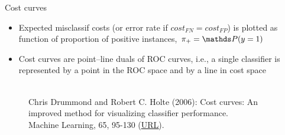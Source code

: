 \documentclass[11pt,compress,t,notes=noshow, xcolor=table]{beamer}
\begin{document}

\begin{vbframe}{Cost curves}

\begin{footnotesize}

\begin{itemize}
  \item Expected misclassif costs (or error rate if $cost_{FN} = cost_{FP}$) is plotted as function of proportion of positive instances, $\rp = \P(y = 1)$
  \item Cost curves are point–line duals of ROC curves, i.e., a single classifier is represented by a point in the ROC space and by a line in cost space
\end{itemize}

\end{footnotesize}

\begin{figure}
  \centering
  \tiny
  \\Chris Drummond and Robert C. Holte (2006): Cost curves: An improved
  method for visualizing classifier performance. \\Machine Learning, 65, 95-130
  (\href{https://www.semanticscholar.org/paper/Cost-curves\%3A-An-improved-method-for  -visualizing-Drummond-Holte/71708ce984e0896e7383435913547e770572410e}
  {\underline{URL}}).
\end{figure}


\end{vbframe}
\end{document}
